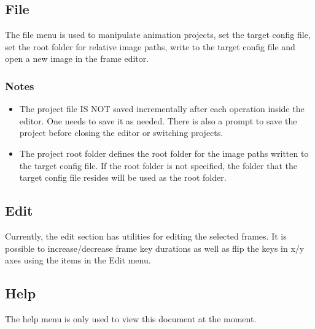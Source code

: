 \documentclass{article}
\begin{document}
\subsection{File}
The file menu is used to manipulate animation projects, set the target config file, set the root folder for relative image paths, write to the target config file and open a new image in the frame editor.

\subsubsection{Notes}
\begin{itemize}
\item The project file IS NOT saved incrementally after each operation inside the editor. One needs to save it as needed. There is also a prompt to save
the project before closing the editor or switching projects.
\item The project root folder defines the root folder for the image paths written to the target config file. If the root folder is not specified, the folder that the target config file resides will be used as the root folder.
\end{itemize}

\subsection{Edit}
Currently, the edit section has utilities for editing the selected frames. It is possible to increase/decrease frame key durations as well as flip the keys in x/y
axes using the items in the Edit menu.

\subsection{Help}
The help menu is only used to view this document at the moment.
\end{document}
